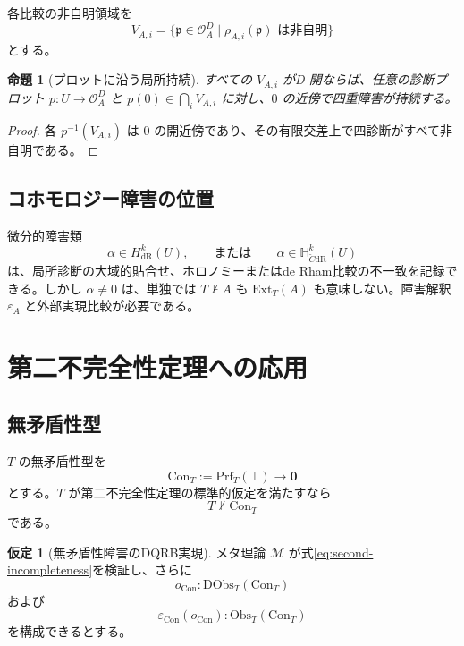 \documentclass[a4paper,11pt]{ltjsarticle}
\theoremstyle{definition}
\newtheorem{assumption}[definition]{仮定}
\theoremstyle{plain}
\newtheorem{proposition}[definition]{命題}
\newcommand{\Obs}{\mathrm{Obs}}
\newcommand{\DObs}{\mathrm{DObs}}
\newcommand{\Ext}{\mathrm{Ext}}
\newcommand{\Prf}{\mathrm{Prf}}
\newcommand{\Con}{\mathrm{Con}}
\newcommand{\Meta}{\mathcal M}
\newcommand{\False}{\mathbf 0}
\begin{document}
各比較の非自明領域を
\begin{equation}
 V_{A,i}=
 \{\mathfrak p\in\mathcal O_A^D
 \mid \rho_{A,i}(\mathfrak p)\text{ は非自明}\}
\end{equation}
とする。

\begin{proposition}[プロットに沿う局所持続]
すべての $V_{A,i}$ がD-開ならば、任意の診断プロット $p:U\to\mathcal O_A^D$ と $p(0)\in\bigcap_iV_{A,i}$ に対し、$0$ の近傍で四重障害が持続する。
\end{proposition}

\begin{proof}
各 $p^{-1}(V_{A,i})$ は $0$ の開近傍であり、その有限交差上で四診断がすべて非自明である。
\end{proof}

\subsection{コホモロジー障害の位置}

微分的障害類
\begin{equation}
 \alpha\in H^k_{\mathrm{dR}}(U),
 \qquad\text{または}\qquad
 \alpha\in\mathbb H^k_{\check C\mathrm{dR}}(U)
\end{equation}
は、局所診断の大域的貼合せ、ホロノミーまたはde Rham比較の不一致を記録できる\cite{Minichiello2024Obstruction,Minichiello2024Bundles}。しかし $\alpha\neq0$ は、単独では $T\nvdash A$ も $\Ext_T(A)$ も意味しない。障害解釈 $\varepsilon_A$ と外部実現比較が必要である。

\section{第二不完全性定理への応用}

\subsection{無矛盾性型}

$T$ の無矛盾性型を
\begin{equation}
 \Con_T:=\Prf_T(\bot)\to\False
 \end{equation}
とする。$T$ が第二不完全性定理の標準的仮定を満たすなら
\begin{equation}
 T\nvdash\Con_T
 \label{eq:second-incompleteness}
\end{equation}
である\cite{godel}。

\begin{assumption}[無矛盾性障害のDQRB実現]
メタ理論 $\Meta$ が式\eqref{eq:second-incompleteness}を検証し、さらに
\begin{equation}
 o_{\Con}:\DObs_T(\Con_T)
\end{equation}
および
\begin{equation}
 \varepsilon_{\Con}(o_{\Con}):\Obs_T(\Con_T)
\end{equation}
を構成できるとする。
\end{assumption}
\end{document}
